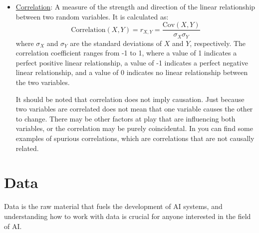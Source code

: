 \begin{itemize}
    A positive covariance indicates that the two variables tend to increase or decrease together, while a negative covariance indicates that one variable tends to increase when the other decreases. A covariance of zero indicates that there is no linear relationship between the two variables.
    \item \ul{Correlation}: A measure of the strength and direction of the linear relationship between two random variables. It is calculated as:
    \begin{equation*}
        \text{Correlation}(X, Y) = r_{X,Y} = \frac{\text{Cov}(X, Y)}{\sigma_X \sigma_Y}
    \end{equation*}
    where $\sigma_X$ and $\sigma_Y$ are the standard deviations of $X$ and $Y$, respectively. The correlation coefficient ranges from -1 to 1, where a value of 1 indicates a perfect positive linear relationship, a value of -1 indicates a perfect negative linear relationship, and a value of 0 indicates no linear relationship between the two variables.

    It should be noted that correlation does not imply causation. Just because two variables are correlated does not mean that one variable causes the other to change. There may be other factors at play that are influencing both variables, or the correlation may be purely coincidental. In  you can find some examples of spurious correlations, which are correlations that are not causally related.
\end{itemize}

\section{Data}
Data is the raw material that fuels the development of AI systems, and understanding how to work with data is crucial for anyone interested in the field of AI.

